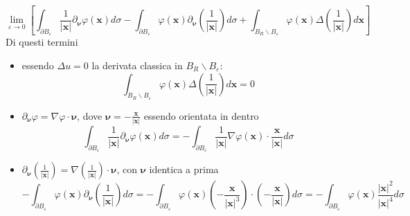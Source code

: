 \documentclass[10pt,a4paper,twoside,openright]{book}
\newcommand{\x}{\mathbf{x}}
\begin{document}
\begin{equation}
	\lim _{\varepsilon \rightarrow 0}\left[\int _{\partial B_{\varepsilon }}\frac{1}{| \x| } \partial _{\bm{\nu }} \varphi (\x) d\sigma -\int _{\partial B_{\varepsilon }} \varphi (\x) \partial _{\bm{\nu }}\left(\frac{1}{| \x| }\right) d\sigma +\int _{B_{R} \backslash B_{\varepsilon }} \varphi (\x) \Delta \left(\frac{1}{| \x| }\right) d\x\right]
	\label{eq:esempio-derivata-limite-2}
\end{equation}
Di questi termini
\begin{itemize}
	\item essendo $\displaystyle \Delta u=0$ la derivata classica in $\displaystyle B_{R} \backslash B_{\varepsilon }$:\begin{equation*}
	      \int _{B_{R} \backslash B_{\varepsilon }} \varphi (\x) \Delta \left(\frac{1}{| \x| }\right) d\x =0
	\end{equation*}
	\item  $\displaystyle \partial _{\bm{\nu }} \varphi =\nabla \varphi \cdotp \bm{\nu }$, dove $\displaystyle \bm{\nu } =-\frac{\x}{| \x| }$ essendo orientata in dentro\begin{equation*}
	      \int _{\partial B_{\varepsilon }}\frac{1}{| \x| } \partial _{\bm{\nu }} \varphi (\x) d\sigma =-\int _{\partial B_{\varepsilon }}\frac{1}{| \x| } \nabla \varphi (\x) \cdotp \frac{\x}{| \x| } d\sigma 
	\end{equation*}
	\item $\displaystyle \partial _{\bm{\nu }}\left(\frac{1}{| \x| }\right) =\nabla \left(\frac{1}{| \x| }\right) \cdotp \bm{\nu }$, con $\displaystyle \bm{\nu }$ identica a prima\begin{equation*}
	      -\int _{\partial B_{\varepsilon }} \varphi (\x) \partial _{\bm{\nu}}\left(\frac{1}{| \x| }\right) d\sigma =-\int _{\partial B_{\varepsilon }} \varphi (\x)\left( -\frac{\x}{| \x| ^{3}}\right) \cdotp \left( -\frac{\x}{| \x| }\right) d\sigma =-\int _{\partial B_{\varepsilon }} \varphi (\x)\frac{| \x| ^{2}}{| \x| ^{4}} d\sigma 
	\end{equation*}
\end{itemize}
\end{document}

